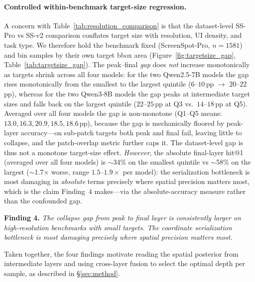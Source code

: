 \paragraph{Controlled within-benchmark target-size regression.}
A concern with Table~\ref{tab:resolution_comparison} is that the dataset-level SS-Pro vs SS-v2 comparison conflates target size with resolution, UI density, and task type.
We therefore hold the benchmark fixed (ScreenSpot-Pro, $n{=}1581$) and bin samples by their own target bbox area (Figure~\ref{fig:targetsize_gap}, Table~\ref{tab:targetsize_gap}).
The peak--final \emph{gap} does \emph{not} increase monotonically as targets shrink across all four models: for the two Qwen2.5-7B models the gap rises monotonically from the smallest to the largest quintile ($6$--$10$\,pp $\to$ $20$--$22$\,pp), whereas for the two Qwen3-8B models the gap peaks at intermediate target sizes and falls back on the largest quintile ($22$--$25$\,pp at Q3 vs.\ $14$--$18$\,pp at Q5).
Averaged over all four models the gap is non-monotone (Q1--Q5 means: $13.0, 16.3, 20.9, 18.5, 18.6$\,pp), because the gap is mechanically floored by peak-layer accuracy---on sub-patch targets both peak and final fail, leaving little to collapse, and the patch-overlap metric further caps it.
The dataset-level gap is thus not a monotone target-size effect.
\emph{However}, the absolute final-layer hit@1 (averaged over all four models) is $\sim$34\% on the smallest quintile vs $\sim$58\% on the largest ($\sim$1.7$\times$ worse, range $1.5$--$1.9\times$ per model): the serialization bottleneck is most damaging in \emph{absolute} terms precisely where spatial precision matters most, which is the claim Finding~4 makes---via the absolute-accuracy measure rather than the confounded gap.

\begin{tcolorbox}[colback=gray!8, colframe=gray!40, boxrule=0.4pt, arc=2pt, left=4pt, right=4pt, top=3pt, bottom=3pt]
\textbf{Finding 4.}
\emph{The collapse gap from peak to final layer is consistently larger on high-resolution benchmarks with small targets. The coordinate serialization bottleneck is most damaging precisely where spatial precision matters most.}
\end{tcolorbox}

Taken together, the four findings motivate reading the spatial posterior from intermediate layers and using cross-layer fusion to select the optimal depth per sample, as described in \S\ref{sec:method}.
